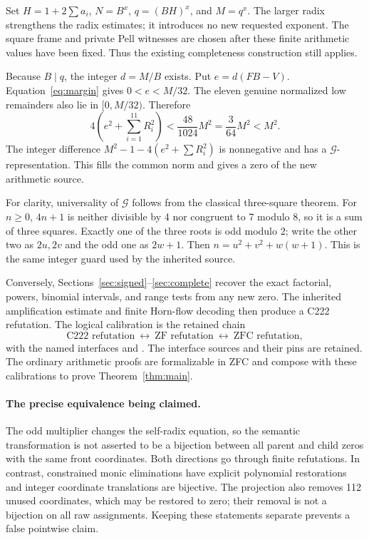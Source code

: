 \documentclass[11pt,letterpaper]{article}
\theoremstyle{remark}\newtheorem{remark}[theorem]{Remark}
\newcommand{\G}{\mathcal G}
\begin{document}
Set \(H=1+2\sum a_i\), \(N=B^x\), \(q=(BH)^x\), and \(M=q^x\).
The larger radix strengthens the radix estimates; it introduces no
new requested exponent. The square frame and private Pell witnesses are
chosen after these finite arithmetic values have been fixed. Thus the
existing completeness construction still applies.

Because \(B\mid q\), the integer \(d=M/B\) exists. Put
\(e=d(FB-V)\). Equation~\eqref{eq:margin} gives
\(0<e<M/32\). The eleven genuine normalized low remainders also lie in
\([0,M/32)\). Therefore
\[
 4\left(e^2+\sum_{i=1}^{11}R_i^2\right)
 <\frac{48}{1024}M^2=\frac3{64}M^2<M^2.
\]
The integer difference
\(M^2-1-4(e^2+\sum R_i^2)\) is nonnegative and has a \(\G\)-representation.
This fills the common norm and gives a zero of the new arithmetic source.

For clarity, universality of \(\G\) follows from the classical three-square
theorem. For \(n\ge0\), \(4n+1\) is neither divisible by 4 nor congruent to
7 modulo 8, so it is a sum of three squares. Exactly one of the three roots
is odd modulo 2; write the other two as \(2u,2v\) and the odd one as
\(2w+1\). Then \(n=u^2+v^2+w(w+1)\). This is the same integer guard
used by the inherited source.

Conversely, Sections~\ref{sec:signed}--\ref{sec:complete} recover the exact
factorial, powers, binomial intervals, and range tests from any new zero.
The inherited amplification estimate and finite Horn-flow decoding then
produce a C222 refutation. The logical calibration is the retained chain
\[
 \text{C222 refutation}\ \longleftrightarrow\
 \text{ZF refutation}\ \longleftrightarrow\
 \text{ZFC refutation},
\]
with the named interfaces
 and
.
The interface sources and their pins are retained. The ordinary arithmetic
proofs are formalizable in ZFC and compose with these calibrations to prove
Theorem~\ref{thm:main}.

\paragraph{The precise equivalence being claimed.}
The odd multiplier changes the self-radix equation, so the semantic
transformation is not asserted to be a bijection between all parent and
child zeros with the same front coordinates. Both directions go through
finite refutations. In contrast, constrained monic eliminations have explicit
polynomial restorations and integer coordinate translations are bijective.
The projection also removes 112 unused coordinates, which may be restored
to zero; their removal is not a bijection on all raw assignments.
Keeping these statements separate prevents a false pointwise claim.
\end{document}
